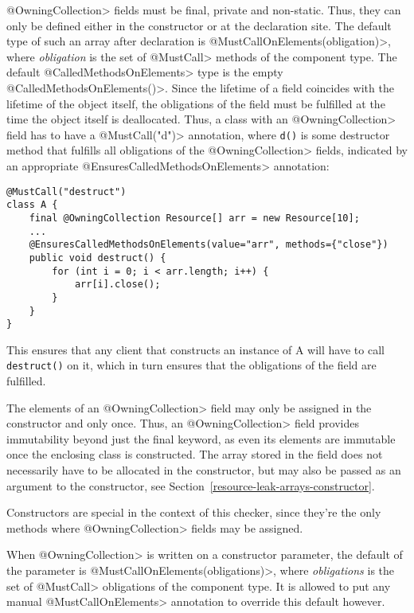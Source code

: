 \<@OwningCollection> fields must be final, private and non-static. Thus, they can only be defined either in the constructor or at the declaration site.
The default type of such an array after declaration is \<@MustCallOnElements(obligation)>, where \textit{obligation} is the set of \<@MustCall> methods of the component type. The default \<@CalledMethodsOnElements> type is the empty \<@CalledMethodsOnElements({})>.
Since the lifetime of a field coincides with the lifetime of the object itself, the obligations of the field must be fulfilled at the time the object itself is deallocated.
Thus, a class with an \<@OwningCollection> field has to have a \<@MustCall("d")> annotation, where \texttt{d()} is some destructor method that fulfills all obligations of the \<@OwningCollection> fields, indicated by an appropriate \<@EnsuresCalledMethodsOnElements> annotation:

\begin{verbatim}
@MustCall("destruct")
class A {
    final @OwningCollection Resource[] arr = new Resource[10];
    ...
    @EnsuresCalledMethodsOnElements(value="arr", methods={"close"})
    public void destruct() {
        for (int i = 0; i < arr.length; i++) {
            arr[i].close();
        }
    }
}
\end{verbatim}

This ensures that any client that constructs an instance of A will have to call \texttt{destruct()} on it, which in turn ensures that the obligations of the field are fulfilled.

The elements of an \<@OwningCollection> field may only be assigned in the constructor and only once. Thus, an \<@OwningCollection> field provides immutability beyond just the final keyword, as even its elements are immutable once the enclosing class is constructed. The array stored in the field does not necessarily have to be allocated in the constructor, but may also be passed as an argument to the constructor, see Section~\ref{resource-leak-arrays-constructor}.

Constructors are special in the context of this checker, since they're the only methods where \<@OwningCollection> fields may be assigned.

When \<@OwningCollection> is written on a constructor parameter, the default of the parameter is \<@MustCallOnElements(obligations)>, where \textit{obligations} is the set of \<@MustCall> obligations of the component type. It is allowed to put any manual \<@MustCallOnElements> annotation to override this default however.


